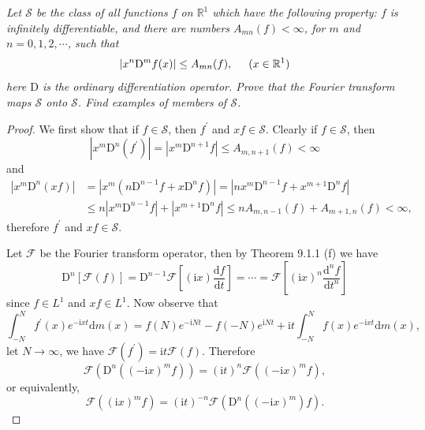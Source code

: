 \begin{problem}\em
Let $\mathscr{S}$ be the class of all functions $f$ on $\mathbb{R}^1$ which have the following property: $f$ is infinitely differentiable, and there are numbers $A_{mn}(f)<\infty$, for $m$ and $n=0,1,2,\cdots$, such that 
$$|x^n\mathrm{D}^mf(x)|\le A_{mn}(f),\hspace{0.5cm}(x\in\mathbb{R}^1)$$
here $\mathrm{D}$ is the ordinary differentiation operator. Prove that the Fourier transform maps $\mathscr{S}$ onto $\mathscr{S}$. Find examples of members of $\mathscr{S}$.
\end{problem}
\begin{proof}
We first show that if $f\in\mathscr{S}$, then $f^\prime$ and $xf\in\mathscr{S}$. Clearly if $f\in\mathscr{S}$, then 
$$
\left| x^m\mathrm{D}^n\left( f^{\prime} \right) \right|=\left| x^m\mathrm{D}^{n+1}f \right|\le A_{m,n+1}\left( f \right) <\infty 
$$
and 
$$
\begin{aligned}
\left| x^m\mathrm{D}^n\left( xf \right) \right|&=\left| x^m\left( n\mathrm{D}^{n-1}f+x\mathrm{D}^nf \right) \right|=\left| nx^m\mathrm{D}^{n-1}f+x^{m+1}\mathrm{D}^nf \right|
\\
&\le n\left| x^m\mathrm{D}^{n-1}f \right|+\left| x^{m+1}\mathrm{D}^nf \right|\le nA_{m,n-1}\left( f \right) +A_{m+1,n}\left( f \right) <\infty ,
\end{aligned}
$$
therefore $f^\prime$ and $xf\in\mathscr{S}$.\par
Let $\mathscr{F}$ be the Fourier transform operator, then by Theorem 9.1.1 (f) we have 
$$
\mathrm{D}^n\left[ \mathscr{F} \left( f \right) \right] =\mathrm{D}^{n-1}\mathscr{F} \left[ \left( \mathrm{i}x \right) \frac{\mathrm{d}f}{\mathrm{d}t} \right] =\cdots =\mathscr{F} \left[ \left( \mathrm{i}x \right) ^n\frac{\mathrm{d}^nf}{\mathrm{d}t^n} \right] 
$$
since $f\in L^1$ and $xf\in L^1$. Now observe that 
$$
\int_{-N}^N{f^{\prime}\left( x \right) e^{-\mathrm{i}xt}\mathrm{d}m\left( x \right)}=f\left( N \right) e^{-\mathrm{i}Nt}-f\left( -N \right) e^{\mathrm{i}Nt}+\mathrm{i}t\int_{-N}^N{f\left( x \right) e^{-\mathrm{i}xt}\mathrm{d}m\left( x \right)},
$$
let $N\to\infty$, we have $\mathscr{F} \left( f^{\prime} \right) =\mathrm{i}t\mathscr{F} \left( f \right) $. Therefore 
$$
\mathscr{F} \left( \mathrm{D}^n\left( \left( -\mathrm{i}x \right) ^mf \right) \right) =\left( \mathrm{i}t \right) ^n\mathscr{F} \left( \left( -\mathrm{i}x \right) ^mf \right) ,
$$
or equivalently, 
$$
\mathscr{F} \left( \left( \mathrm{i}x \right) ^mf \right) =\left( \mathrm{i}t \right) ^{-n}\mathscr{F} \left( \mathrm{D}^n\left( \left( -\mathrm{i}x \right) ^m \right) f \right) .
$$
\end{proof}
